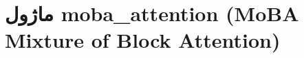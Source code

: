 \section{ماژول moba\_attention (MoBA Mixture of Block Attention)}
\label{sec:module_moba_attention}
